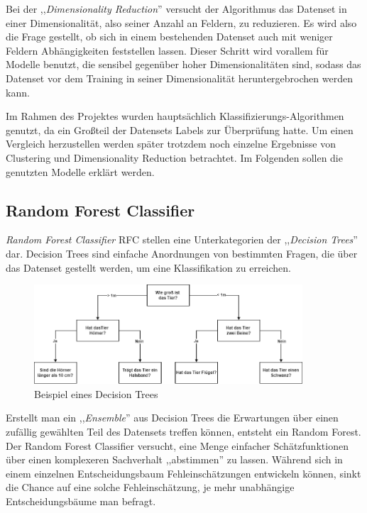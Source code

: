 Bei der ,,\textit{Dimensionality Reduction}'' versucht der Algorithmus das Datenset in einer 
Dimensionalität, also seiner Anzahl an Feldern, zu reduzieren. Es wird also die Frage gestellt, 
ob sich in einem bestehenden Datenset auch mit weniger Feldern Abhängigkeiten feststellen lassen. Dieser 
Schritt wird vorallem für Modelle benutzt, die sensibel gegenüber hoher Dimensionalitäten sind, 
sodass das Datenset vor dem Training in seiner Dimensionalität heruntergebrochen werden kann.

Im Rahmen des Projektes wurden hauptsächlich Klassifizierungs-Algorithmen genutzt, da ein Großteil der 
Datensets Labels zur Überprüfung hatte. Um einen Vergleich herzustellen werden später trotzdem noch 
einzelne Ergebnisse von Clustering und Dimensionality Reduction betrachtet. Im Folgenden sollen die genutzten 
Modelle erklärt werden.
\newpage
\subsection{Random Forest Classifier}

\textit{Random Forest Classifier} RFC stellen eine Unterkategorien der ,,\textit{Decision Trees}'' dar. Decision Trees sind einfache
Anordnungen von bestimmten Fragen, die über das Datenset gestellt werden, um eine Klassifikation zu erreichen.

\begin{figure}[h]
    \centering
    \includegraphics[width=10.0cm]{pic/DecisionTree.png}
    \caption{Beispiel eines Decision Trees}
    \label{fig:DT_Beispiel}
\end{figure}

Erstellt man ein ,,\textit{Ensemble}'' aus Decision Trees die Erwartungen über einen zufällig gewählten 
Teil des Datensets treffen können, entsteht ein Random Forest.
Der Random Forest Classifier versucht, eine Menge einfacher Schätzfunktionen über einen komplexeren 
Sachverhalt ,,abstimmen'' zu lassen. Während sich in einem einzelnen Entscheidungsbaum Fehleinschätzungen 
entwickeln können, sinkt die Chance auf eine solche Fehleinschätzung, je mehr unabhängige 
Entscheidungsbäume man befragt. 


